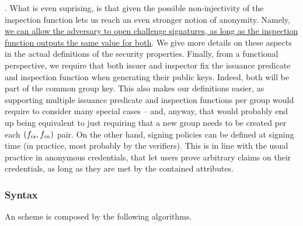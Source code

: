 \Inspect. What is even suprising, is that given the possible non-injectivity of
the inspection function lets us reach an even stronger notion of anonymity.
Namely, \uline{we can allow the adversary to open challenge signatures, as
  long as the inspection function outputs the same value for both}. We give more
details on these aspects in the actual definitions of the security properties.
%
Finally, from a functional perspective, we require that both issuer and
inspector fix the issuance predicate \fissue and inspection function \finsp when
generating their public keys. Indeed, both will be part of the common group key.
This also makes our definitions easier, as supporting multiple issuance
predicate and inspection functions per group would require to consider many
special cases -- and, anyway, that would probably end up being equivalent to
just requiring that a new group needs to be created per each $(f_{is},f_{in})$
pair. On the other hand, signing policies can be defined at signing time (in
practice, most probably by the verifiers). This is in line with the usual
practice in anonymous credentials, that let users prove arbitrary claims on
their credentials, as long as they are met by the contained attributes.

\subsubsection{Syntax}
\label{sssec:syntax}

An \UAS scheme is composed by the following algorithms.


